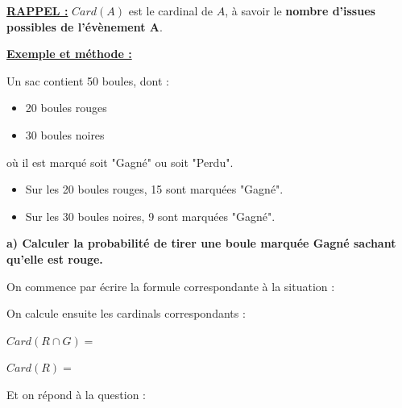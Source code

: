 \documentclass[12pt]{article}
\begin{document}
{\color{red}\textbf{\underline{RAPPEL :}}} $Card(A)$ est le cardinal de $A$, à savoir le \textbf{nombre d'issues 
possibles de l'évènement A}.


\vspace{10pt}
{\color{red}\bf{\underline{Exemple et méthode :}}}

\vspace{5pt}
Un sac contient 50 boules, dont :
\begin{itemize}
    \item 20 boules rouges
    \item 30 boules noires
\end{itemize}
où il est marqué soit "Gagné" ou soit "Perdu".

\begin{itemize}
    \item Sur les 20 boules rouges, 15 sont marquées "Gagné".
    \item Sur les 30 boules noires, 9 sont marquées "Gagné".
\end{itemize}

\vspace{10pt}
\textbf{a) Calculer la probabilité de tirer une boule marquée Gagné sachant qu'elle est rouge.}

\vspace{5pt}
On commence par écrire la formule correspondante à la situation :

\vspace{0.5cm}
{\color{black!30}\dotfill}

\vspace{0.5cm}
{\color{black!30}\dotfill}

\vspace{10pt}
On calcule ensuite les cardinals correspondants :

\begin{minipage}[t]{.45\textwidth}%
    \vspace{10pt}
    $Card(R \cap G) = $ {\color{black!30}\dotfill}

    \vspace{20pt}
    $Card(R) = $ {\color{black!30}\dotfill}
\end{minipage}%
\hfill
\begin{minipage}[t]{.45\textwidth}%
    \vspace{0pt}
    
\end{minipage}%

\vspace{10pt}
Et on répond à la question : 
\end{document}
